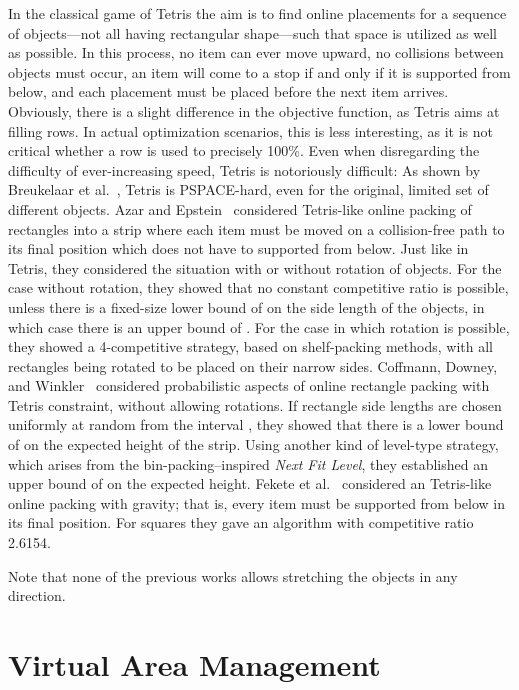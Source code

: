 \documentclass[10pt,journal]{IEEEtran}
\begin{document}
In the classical game of Tetris the aim is to find online placements
for a sequence of objects---not all having rectangular shape---such
that space is utilized as well as possible. In this
process, no item can ever move upward, no collisions between objects
must occur, an item will come to a stop if and only if it is supported
from below, and each placement must be placed before the next item
arrives. Obviously, there is a
slight difference in the objective function, as Tetris aims at filling
rows. In actual optimization scenarios, this is less interesting, as
it is not critical whether a row is used to precisely 100\%. 
Even when disregarding the difficulty of ever-increasing
speed, Tetris is notoriously difficult: As shown by Breukelaar et
al.~\cite{bdhhkl-tihea-04}, Tetris is PSPACE-hard, even for the
original, limited set of different objects. Azar and
Epstein~\cite{ae-tdp-97} considered Tetris-like online packing of
rectangles into a strip where each item must be moved on a collision-free 
path to its final position which does not have to supported from
below. Just like in Tetris, they considered the situation with or
without rotation of objects. For the case without rotation, they
showed that no constant competitive ratio is possible, unless there is
a fixed-size lower bound of  on the side length of the
objects, in which case there is an upper bound of
. For the case in which rotation is
possible, they showed a 4-competitive strategy, based on shelf-packing
methods, with all rectangles being rotated to be placed on their
narrow sides. Coffmann, Downey, and Winkler~\cite{cdw-prs-02}
considered probabilistic aspects of online rectangle packing with
Tetris constraint, without allowing rotations. If rectangle side
lengths are chosen uniformly at random from the interval , they
showed that there is a lower bound of  on the
expected height of the strip. Using another kind of level-type
strategy, which arises from the bin-packing--inspired {\em Next Fit
  Level}, they established an upper bound of  on the
expected height. 
Fekete et al.~\cite{fks-olsp-09p} considered an Tetris-like online packing
with gravity; that is, every item must be supported from
below in its final position. For squares they gave an algorithm with
competitive ratio 2.6154. 

Note that none of the previous works allows
stretching the objects in any direction.


\section{Virtual Area Management}
\end{document}
